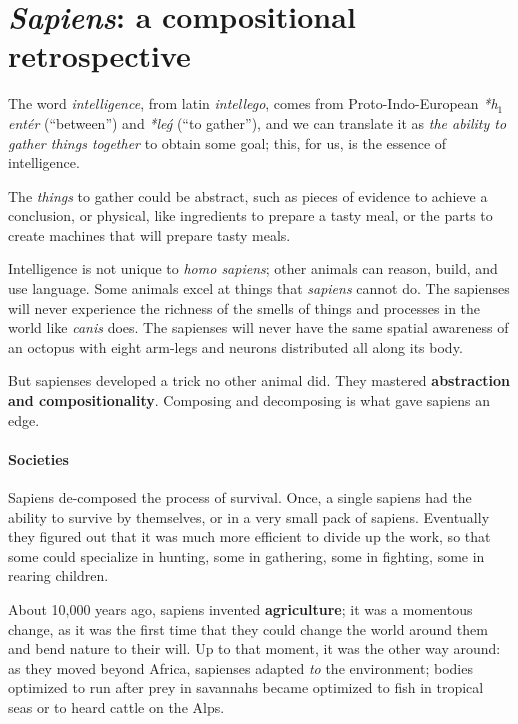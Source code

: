 
\section[Sapiens: a retrospective]{
    \emph{Sapiens}: a compositional retrospective
}

\label{sec:brief-history}

The word \emph{intelligence}, from latin \emph{intellego}, comes from Proto-Indo-European  \emph{*h${}_1$entér} (``between'') and \emph{*leǵ} (``to gather''), and we can translate it as \emph{the ability to gather things together} to obtain some goal;
this, for us, is the essence of intelligence.

The \emph{things} to gather could be abstract, such as pieces of evidence to achieve a conclusion, or physical, like ingredients to prepare a tasty meal, or the parts to create machines that will prepare tasty meals.

Intelligence is not unique to \emph{homo sapiens}; other animals can reason, build, and use language.
Some animals excel at things that \emph{sapiens} cannot do.
The sapienses will never experience the richness of the smells of things and processes in the world like \emph{canis} does.
The sapienses will never have the same spatial awareness of an octopus with eight arm-legs and neurons distributed all along its body.

But sapienses developed a trick no other animal did.
They mastered \textbf{abstraction and compositionality}.
Composing and decomposing is what gave sapiens an edge.

\paragraph{Societies}

Sapiens de-composed the process of survival.
Once, a single sapiens had the ability to survive by themselves, or in a very small pack of sapiens.
Eventually they figured out that it was much more efficient to divide up the work, so that some could specialize in hunting, some in gathering, some in fighting, some in rearing children.

About 10,000 years ago, sapiens invented \textbf{agriculture}; it was a momentous change, as it was the first time that they could change the world around them and bend nature to their will.
Up to that moment, it was the other way around: as they moved beyond Africa, sapienses adapted \emph{to} the environment;
bodies optimized to run after prey in savannahs became optimized to fish in tropical seas or to heard cattle on the Alps.

